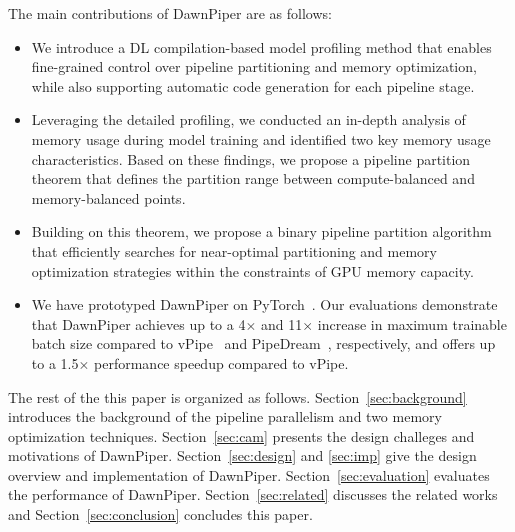 The main contributions of DawnPiper are as follows:
\begin{itemize}
      \item We introduce a DL compilation-based model profiling method that enables
      fine-grained control over pipeline partitioning and memory optimization,
      while also supporting automatic code generation for each pipeline stage.
      \item Leveraging the detailed profiling,
      we conducted an in-depth analysis of memory usage during model training and
      identified two key memory usage characteristics.
      Based on these findings, we propose a pipeline partition theorem that defines
      the partition range between compute-balanced and memory-balanced points.
      \item Building on this theorem,
      we propose a binary pipeline partition algorithm that efficiently searches
      for near-optimal partitioning and memory optimization strategies within the constraints of GPU memory capacity.
      \item We have prototyped DawnPiper on PyTorch~\cite{paszkePytorchImperativeStyle2019}.
      Our evaluations demonstrate that DawnPiper achieves up to a 4$\times$ and 11$\times$ increase
      in maximum trainable batch size compared to vPipe~\cite{zhaoVPipeVirtualizedAcceleration2022}
      and PipeDream~\cite{narayananPipeDreamGeneralizedPipeline2019}, respectively,
      and offers up to a 1.5$\times$ performance speedup compared to vPipe.
\end{itemize}

The rest of the this paper is organized as follows.
Section~\ref{sec:background} introduces the background of
the pipeline parallelism and two memory optimization techniques.
Section~\ref{sec:cam} presents the design challeges and motivations of DawnPiper.
Section~\ref{sec:design} and \ref{sec:imp} give the design overview and
implementation of DawnPiper.
Section~\ref{sec:evaluation} evaluates the performance of DawnPiper.
Section~\ref{sec:related} discusses the related works
and Section~\ref{sec:conclusion} concludes this paper.
\label{sec:intro}
